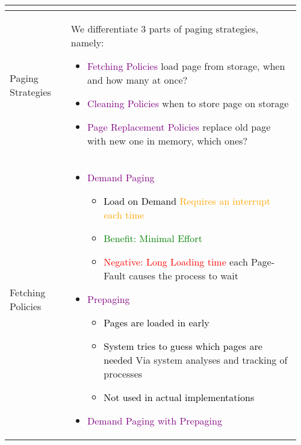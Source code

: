 \documentclass[main.tex,fontsize=8pt,paper=a4,paper=portrait,DIV=calc,]{scrartcl}
\begin{document}
\begin{table}[ht!]
\begin{tabular}{|m{0.2\linewidth}|m{0.755\linewidth}|}
\begin{itemize}
\end{itemize} \\
\hline
Paging Strategies & 
We differentiate 3 parts of paging strategies, namely:\newline
\begin{itemize}
\item \textcolor{purple}{Fetching Policies}\newline
  load page from storage, when and how many at once?
\item \textcolor{purple}{Cleaning Policies}\newline
  when to store page on storage
\item \textcolor{purple}{Page Replacement Policies}\newline
  replace old page with new one in memory, which ones?
\vspace{-3mm}
\end{itemize} 
\\
\hline
Fetching Policies & 
\vspace{2mm}
\begin{itemize}
\item \textcolor{purple}{Demand Paging}\newline
  \begin{itemize}
  \item \textcolor{black}{Load on Demand}\newline
    \textcolor{orange}{Requires an interrupt each time}
  \item \textcolor{green}{Benefit: Minimal Effort}
  \item \textcolor{red}{Negative: Long Loading time}\newline
    each Page-Fault causes the process to wait
  \end{itemize} 
\item \textcolor{purple}{Prepaging}
  \begin{itemize}
  \item \textcolor{black}{Pages are loaded in early}
  \item \textcolor{black}{System tries to guess which pages are needed}\newline
    Via system analyses and tracking of processes
  \item \textcolor{black}{Not used in actual implementations}
  \end{itemize} 
\item \textcolor{purple}{Demand Paging with Prepaging}\newline
  \begin{itemize}

\end{itemize}
\end{itemize}
\end{tabular}
\end{table}
\end{document}
